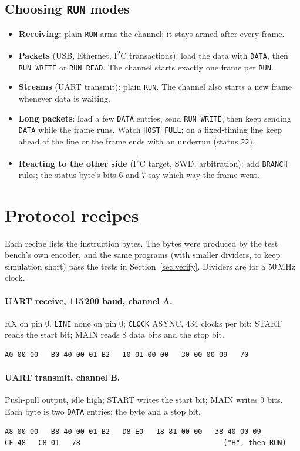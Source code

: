 \documentclass[11pt,a4paper]{article}
\newcommand{\sig}[1]{\texttt{#1}}
\begin{document}
\subsection{Choosing \sig{RUN} modes}

\begin{itemize}
\item \textbf{Receiving:} plain \sig{RUN} arms the channel; it stays armed after every frame.
\item \textbf{Packets} (USB, Ethernet, I\textsuperscript{2}C transactions): load the data with \sig{DATA}, then \sig{RUN WRITE} or \sig{RUN READ}. The channel starts exactly one frame per \sig{RUN}.
\item \textbf{Streams} (UART transmit): plain \sig{RUN}. The channel also starts a new frame whenever data is waiting.
\item \textbf{Long packets}: load a few \sig{DATA} entries, send \sig{RUN WRITE}, then keep sending \sig{DATA} while the frame runs. Watch \sig{HOST\_FULL}; on a fixed-timing line keep ahead of the line or the frame ends with an underrun (status \texttt{22}).
\item \textbf{Reacting to the other side} (I\textsuperscript{2}C target, SWD, arbitration): add \sig{BRANCH} rules; the status byte's bits 6 and 7 say which way the frame went.
\end{itemize}

\section{Protocol recipes}

Each recipe lists the instruction bytes. The bytes were produced by the test bench's own encoder, and the same programs (with smaller dividers, to keep simulation short) pass the tests in Section~\ref{sec:verify}. Dividers are for a 50\,MHz clock.


\paragraph{UART receive, 115\,200 baud, channel A.} RX on pin 0. \sig{LINE} none on pin 0; \sig{CLOCK} ASYNC, 434 clocks per bit; START reads the start bit; MAIN reads 8 data bits and the stop bit.
\begin{lstlisting}
A0 00 00   B0 40 00 01 B2   10 01 00 00   30 00 00 09   70
\end{lstlisting}


\paragraph{UART transmit, channel B.} Push-pull output, idle high; START writes the start bit; MAIN writes 9 bits. Each byte is two \sig{DATA} entries: the byte and a stop bit.
\begin{lstlisting}
A8 00 00   B8 40 00 01 B2   D8 E0   18 81 00 00   38 40 00 09
CF 48   C8 01   78                                  ("H", then RUN)
\end{lstlisting}
\end{document}
